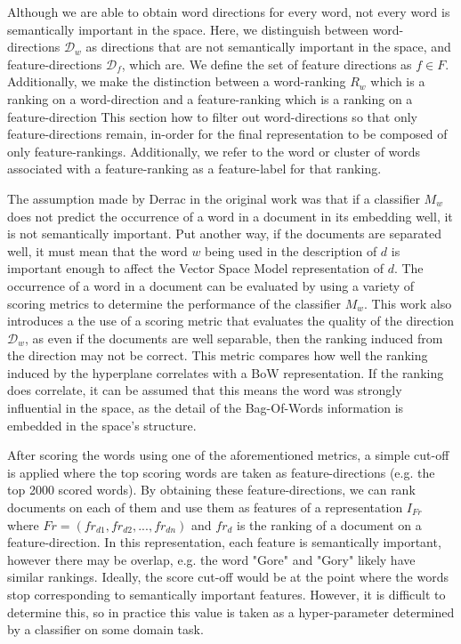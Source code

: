 Although we are able to obtain word directions for every word, not every word is semantically important in the space. Here, we distinguish between word-directions $\mathcal{D}_w$ as directions that are not semantically important in the space, and feature-directions $\mathcal{D}_f$, which are. We define the set of feature directions as $f \in F$. Additionally, we make the distinction between a word-ranking $R_w$ which is a ranking on a word-direction and a feature-ranking which is a ranking on a feature-direction  This section how to filter out word-directions so that only feature-directions remain, in-order for the final representation to be composed of only feature-rankings. Additionally, we refer to the word or cluster of words associated with a feature-ranking as a feature-label for that ranking.
 
The assumption made by Derrac in the original work \cite{Derrac2015} was that if a classifier $M_w$ does not predict the occurrence of a word in a document in its embedding well, it is not semantically important. Put another way, if the documents are separated well, it must mean that the word $w$ being used in the description of $d$ is important enough to affect the Vector Space Model representation of $d$. The occurrence of a word in a document can be evaluated by using a variety of scoring metrics to determine the performance of the classifier $M_w$. This work also introduces a the use of a scoring metric that evaluates the quality of the direction $\mathcal{D}_w$, as even if the documents are well separable, then the ranking induced from the direction may not be correct. This metric compares how well the ranking induced by the hyperplane correlates with a BoW representation. If the ranking does correlate, it can be assumed that this means the word was strongly influential in the space, as the detail of the Bag-Of-Words information is embedded in the space's structure. 

After scoring the words using one of the aforementioned metrics, a simple cut-off is applied where the top scoring words are taken as feature-directions (e.g. the top 2000 scored words). By obtaining these feature-directions, we can rank documents on each of them and use them as features of a  representation $I_{Fr}$ where ${Fr} = ({fr}_{d1}, {fr}_{d2}, ..., {fr}_{dn})$ and ${fr}_d$ is the ranking of a document on a feature-direction. In this representation, each feature is semantically important, however there may be overlap, e.g. the word "Gore" and "Gory" likely have similar rankings. Ideally, the score cut-off would be at the point where the words stop corresponding to semantically important features. However, it is difficult to determine this, so in practice this value is taken as a hyper-parameter determined by a classifier on some domain task.

